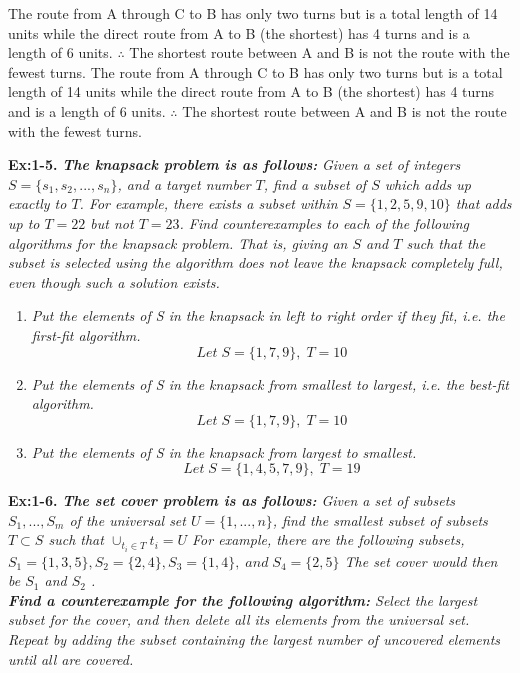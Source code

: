 {\raggedleft{}
\begin{minipage}{.80\textwidth}{\color{answer}{}
The route from A through C to B has only two turns but is a total length of 14 units while the direct route from A to B (the shortest) has 4 turns and is a length of 6 units. $\therefore$ The shortest route between A and B is not the route with the fewest turns.
The route from A through C to B has only two turns but is a total length of 14 units while 
the direct route from A to B (the shortest) has 4 turns and is a length of 6 units. 
$\therefore$ The shortest route between A and B is not the route with the fewest turns.
}\end{minipage} \newline{}
}


%
%
%
{\raggedleft{}\textbf{\enspace Ex:1-5.} \emph{\textbf{The knapsack problem is as follows:}} \emph{Given a set of integers $S = \{s_{1}, s_{2},...,s_{n}\}$,
and a target number $T$, find a subset of $S$ which adds up exactly to $T$. For example,
there exists a subset within $S = \{1, 2, 5, 9, 10\}$ that adds up to $T = 22$ but not
$T = 23$.
Find counterexamples to each of the following algorithms for the knapsack problem.
That is, giving an $S$ and $T$ such that the subset is selected using the algorithm does
not leave the knapsack completely full, even though such a solution exists.}}

\begin{minipage}{.80\textwidth}
\begin{enumerate}[label=(\alph*)]
\itemsep1pt\parskip0pt
	\item{\emph{Put the elements of S in the knapsack in left to right order if they fit, i.e. the first-fit algorithm.} \\
		\textcolor{answer}{
		 $$Let\;  S = \{1,7,9\}, \; T = 10$$
		}
	}
	\item{\emph{Put the elements of S in the knapsack from smallest to largest, i.e. the best-fit algorithm.} \\
		\textcolor{answer}{
		$$Let\;  S = \{1,7,9\}, \; T = 10$$
		}
	}
	\item{\emph{Put the elements of S in the knapsack from largest to smallest.} \\
		\textcolor{answer}{
		$$Let\;  S = \{1,4,5,7,9\}, \; T = 19$$
		}
	}
\end{enumerate}
\end{minipage} \newline{}

\textbf{\enspace Ex:1-6.} \emph{\textbf{The set cover problem is as follows: } Given a set of subsets $S_{1}, ..., S_{m}$ of the universal set 
$U = \{1, ..., n\}$, 
find the smallest subset of subsets 
$T \subset S$ 
such that  
$\cup_{t_{i} \in T}t_{i} = U$ For example, there are the following subsets, $S_{1} = \{1, 3, 5\}, S_{2} = \{2, 4\}, S_{3} = \{1, 4\}, \; and \; S_{4} = \{2, 5\}$ The set cover would then be $S_{1}$ and $S_{2}$ . } \\
\emph{\textbf{Find a counterexample for the following algorithm:} Select the largest subset for the cover, and then delete all its elements from the universal set. Repeat by adding the subset containing the largest number of uncovered elements until all are covered.}

